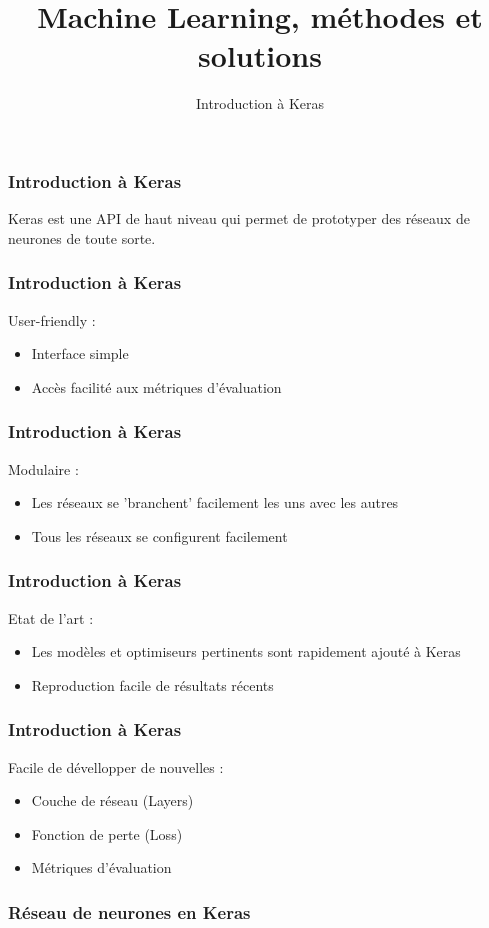 \documentclass{formation}
\title{Machine Learning, méthodes et solutions}
\subtitle{Introduction à Keras}
\begin{document}
\maketitle

\begin{frame}
  \frametitle{Introduction à Keras}
  Keras est une API de haut niveau qui permet de prototyper des réseaux de neurones de toute sorte.
\end{frame}

\begin{frame}
  \frametitle{Introduction à Keras}
  User-friendly :
  \begin{itemize}
  \item Interface simple
  \item Accès facilité aux métriques d'évaluation
  \end{itemize}
\end{frame}

\begin{frame}
  \frametitle{Introduction à Keras}
  Modulaire :
  \begin{itemize}
  \item Les réseaux se 'branchent' facilement les uns avec les autres
  \item Tous les réseaux se configurent facilement
  \end{itemize}
\end{frame}

\begin{frame}
  \frametitle{Introduction à Keras}
  Etat de l'art :
  \begin{itemize}
  \item Les modèles et optimiseurs pertinents sont rapidement ajouté à Keras
  \item Reproduction facile de résultats récents
  \end{itemize}
\end{frame}

\begin{frame}
  \frametitle{Introduction à Keras}
  Facile de dévellopper de nouvelles :
  \begin{itemize}
  \item Couche de réseau (Layers)
  \item Fonction de perte (Loss)
  \item Métriques d'évaluation
  \end{itemize}
\end{frame}

\begin{frame}
  \frametitle{Réseau de neurones en Keras}
  \inputminted[linenos,fontsize=\small,bgcolor=pythonbg]{python}{code-illustration/tf-keras-mlp.py}
\end{frame}
\end{document}
